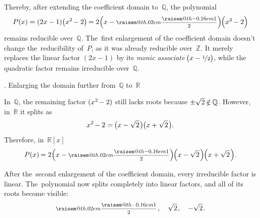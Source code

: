 \documentclass[11pt, twoside]{book}
\makeatletter
\newcommand\fex{\hspace{.2ex}} %
\newcommand\nfex{\hspace{-0.2ex}} %
\newcommand\thex{\hspace{.1ex}} %
\newcommand\nthex{\hspace{-0.1ex}} %
\newcommand{\textsb}[1]{{\fontseries{sb}\selectfont #1}}
\newcommand\cnotin{\nfex\notin\nfex}
\newcommand{\raisemath}[1]{\mathpalette{\raisem@th{#1}}}
\newcommand{\raisem@th}[3]{\raisebox{#1}{$#2#3$}}
\newcommand\onehalf{\raisemath{.02em}{\frac{\raisemath{-0.16em}{1}}{2}}}
\newcommand\smalldisplaystyleonehalf{\scalebox{.8}{$\displaystyle \onehalf$}\thex}
\makeatother
\begin{document}
\vspace{-0.25em}
\noindent
\begin{minipage}{\linewidth}
Thereby, after extending the coefficient domain to~$\mathbb{Q}$,
the polynomial
%
\vspace{-0.25em}
\begin{equation*}
P(x) = (2x - 1)\bigl(x^2 \nfex - 2\bigr) \nfex = 2 \Bigl(x - \smalldisplaystyleonehalf\Bigr) \nfex \Bigl(x^2 \nfex - 2\Bigr)
\vspace{-0.25em}
\end{equation*}
%
remains reducible over~$\mathbb{Q}$.
%
The~first enlargement of the coefficient domain doesn’t change the~reducibility of~$P$, as it was already reducible over~$\mathbb{Z}$.
It merely replaces the linear factor ${(2x - 1)}$ by its \emph{monic associate} ${\nfex\bigl(x - \nicefrac{1}{2}\bigr)\nthex}$,
while the quadratic factor remains irreducible over~$\mathbb{Q}$.
\end{minipage}

\vspace{.5em}

\noindent
\textsb{3. Enlarging the domain further from~$\mathbb{Q}$ to~$\mathbb{R}$}

In~$\mathbb{Q}$, the remaining factor ${(x^2 \nfex - 2)}$ still lacks roots because ${\pm\sqrt{2} \cnotin \mathbb{Q}}$.
However, in~$\mathbb{R}$ it splits as
%
\vspace{-0.25em}
\begin{equation*}
x^2 \nfex - 2 \thex = \nfex \bigl(x - \sqrt{2}\fex\bigr) \nthex \bigl(x + \sqrt{2}\fex\bigr)
.
\vspace{-0.75em}
\end{equation*}
%
Therefore, in~$\mathbb{R}[x]$
%
\vspace{-0.5em}
\begin{equation*}
P(x) \nfex
= 2 \Bigl(x - \smalldisplaystyleonehalf\Bigr) \nfex \Bigl(x - \sqrt{2}\fex\Bigr) \nfex \Bigl(x + \sqrt{2}\fex\Bigr)
.
\end{equation*}

\vspace{-0.5em}
After the~second enlargement of the coefficient domain, every irreducible factor is linear.
The~polynomial now splits completely into linear factors, and all of its roots become visible\::
%
\vspace{-0.25em}
\begin{equation*}
\smalldisplaystyleonehalf \fex, \quad \sqrt{2} \fex, \quad -\sqrt{2}
\fex .
\end{equation*}
\end{document}
